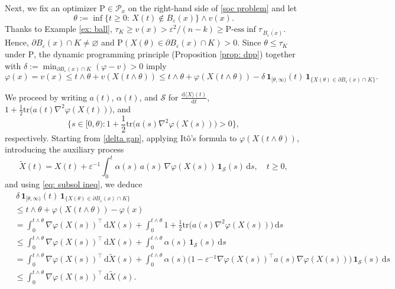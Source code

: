 \documentclass[11pt]{amsart}
\numberwithin{equation}{section}
\begin{document}
\medskip

Next, we fix an optimizer $\mathrm{P}\in\mathcal{P}_{x}$ on the right-hand side of \eqref{soc problem} and let 
\begin{equation}
\theta := \inf\big\{t \geq 0:\, X(t) \notin B_{\varepsilon}(x)\big\} \wedge v(x). 
\end{equation}
Thanks to Example \ref{ex: ball}, $\tau_K\ge v(x)>\varepsilon^2/(n-k)\ge \mathrm{P}\text{-ess} \inf \tau_{\,\overline{B_{\varepsilon}(x)}}$. Hence, $\partial B_{\varepsilon}(x)\cap K \neq \varnothing$ and $\mathrm{P}(X({\theta}) \in \partial B_{\varepsilon}(x)\cap K)>0$. Since $\theta\leq \tau_K$ under $\mathrm{P}$, the dynamic programming principle (Proposition \ref{prop: dpp}) together with $\delta := \min_{\partial B_{\varepsilon}(x)\cap K} (\varphi-v)>0$ imply
\begin{equation}\label{delta gap}
\varphi(x) = v(x) \leq t\wedge \theta + v(X(t\wedge \theta)) \leq t\wedge \theta + \varphi(X(t \wedge \theta))- \delta\,\mathbf{1}_{[\theta, \infty)}(t)\,\mathbf{1}_{\{X(\theta)\in\partial B_{\varepsilon}(x)\cap K\}}.
\end{equation}

\smallskip

We proceed by writing $a(t)$, $\alpha(t)$, and $\mathcal{S}$ for $\frac{\mathrm{d}\langle X\rangle(t)}{\mathrm{d}t}$, $1+\frac{1}{2}\text{tr}\big(a(t)\nabla^2\varphi(X(t))\big)$, and
$$ 
\Big\{ s \in [0, \theta) : 1 + \frac{1}{2} \text{tr}\big(a(s) \nabla^2 \varphi(X(s))\big) > 0 \Big\},
$$
respectively. Starting from \eqref{delta gap}, applying It\^o's formula to $\varphi(X(t\wedge\theta))$, introducing the auxiliary process 
$$\widetilde{X}(t) = X(t) + \varepsilon^{-1}  \int_{0}^{t} \alpha(s)\, a(s)\, \nabla\varphi(X(s)) \,\mathbf{1}_{\mathcal S}(s) \,\mathrm{d}s,\quad t\ge0,
$$
and using \eqref{eq: subsol ineq}, we deduce
\begin{align*}
&\,\delta\,\mathbf{1}_{[\theta, \infty)}(t)\,\mathbf{1}_{\{X(\theta) \in \partial B_{\varepsilon}(x)\cap K\}} \\
& \leq t\wedge \theta + \varphi(X(t\wedge \theta)) - \varphi(x) \\
& = \int_0^{t \wedge \theta} \nabla\varphi(X(s))^{\top}\,\mathrm{d}X(s) 
+ \int_0^{t \wedge \theta} 
1 + \frac{1}{2}\text{tr}\big(a(s)\nabla^2\varphi(X(s))\big)\,\mathrm{d}{s} \\
&\leq \int_0^{t \wedge \theta} \nabla\varphi(X(s))^{\top}\,\mathrm{d}X(s) 
+ \int_0^{t \wedge \theta}  \alpha(s)\,\mathbf{1}_{\mathcal S}(s)\,\mathrm{d}{s} \\
&= \int_0^{t \wedge \theta} \nabla\varphi(X(s))^{\top}\,\mathrm{d}\widetilde{X}(s) 
+ \int_0^{t \wedge \theta} \alpha(s)\big(1 - \varepsilon^{-1} \nabla\varphi(X(s))^{\top}a(s)\nabla\varphi(X(s))\big)\,\mathbf{1}_{\mathcal S}(s)\,\mathrm{d}s \\
&\le \int_0^{t \wedge \theta} \nabla\varphi(X(s))^{\top}\,\mathrm{d}\widetilde{X}(s).
\end{align*}
\end{document}
